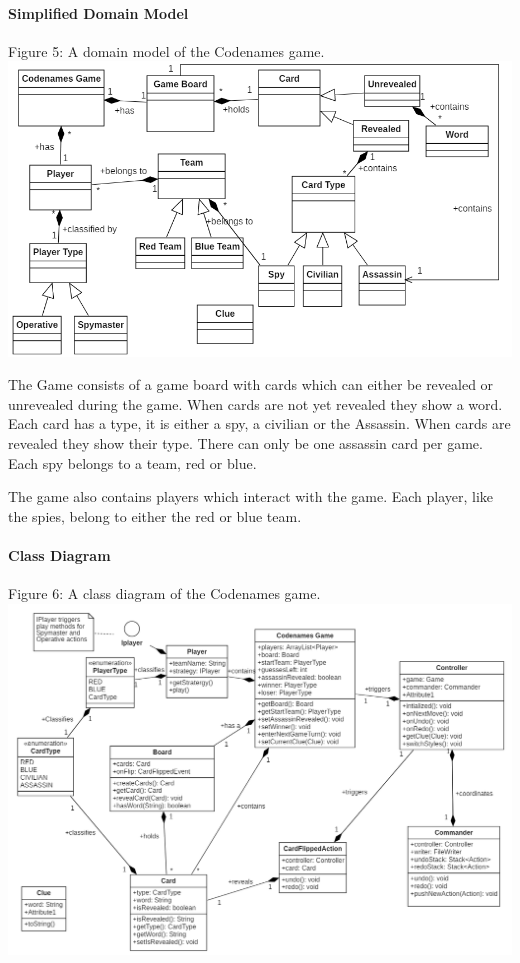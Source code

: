 \documentclass[10pt, a4paper]{article}
\begin{document}
		\paragraph{Simplified Domain Model}
			\begin{center}
				Figure 5: A domain model of the Codenames game. 
				\includegraphics[scale=.90]{Images/domain_model_final.png}
				
			\end{center}
		The Game consists of a game board with cards which can either be revealed or unrevealed during the game. When cards are not yet revealed they show a word. Each card has a type, it is either a spy, a civilian or the Assassin. When cards are revealed they show their type. There can only be one assassin card per game. Each spy belongs to a team, red or blue. 
		
		The game also contains players which interact with the game. Each player, like the spies, belong to either the red or blue team. 
			\pagebreak
			\paragraph{Class Diagram}
				\begin{center}
				Figure 6: A class diagram of the Codenames game. 
				\includegraphics[scale=.60]{Images/class_diagram_final.png}
				
			\end{center}
			
\end{document}

